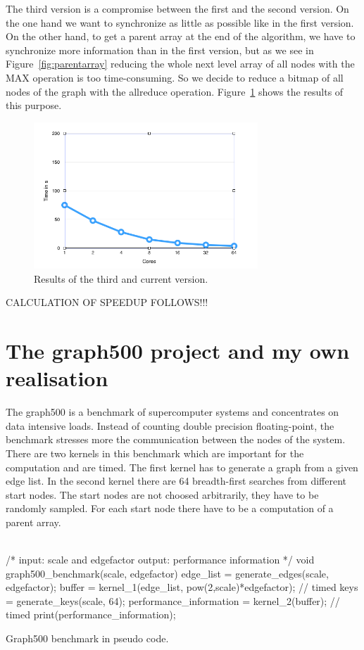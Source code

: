 \documentclass[12pt,a4paper]{article}
\begin{document}
The third version is a compromise between the first and the second version. On the one hand we want to synchronize as little as possible like in the first version. On the other hand, to get a parent array at the end of the algorithm, we have to synchronize more information than in the first version, but as we see in Figure~\ref{fig:parentarray} reducing the whole next level array of all nodes with the MAX operation is too time-consuming. So we decide to reduce a bitmap of all nodes of the graph with the allreduce operation. Figure~\ref{fig:allvisited} shows the results of this purpose.

\begin{figure}[H]
   \centering
   \includegraphics[width=0.75\textwidth]{allvisited}
   \caption{Results of the third and current version.}
   \label{fig:allvisited}
\end{figure}

CALCULATION OF SPEEDUP FOLLOWS!!!

\section{The graph500 project and my own realisation}
\label{sec:graph500}

The graph500 \cite{graph500} is a benchmark of supercomputer systems and concentrates on data intensive loads. Instead of counting double precision floating-point, the benchmark stresses more the communication between the nodes of the system. There are two kernels in this benchmark which are important for the computation and are timed. The first kernel has to generate a graph from a given edge list. In the second kernel there are 64 breadth-first searches from different start nodes. The start nodes are not choosed arbitrarily, they have to be randomly sampled. For each start node there have to be a computation of a parent array.\\
\\
\begin{listing}[H]
\begin{ccode}
/*
input: scale and edgefactor
output: performance information
*/
void graph500_benchmark(scale, edgefactor){
	edge_list = generate_edges(scale, edgefactor);
	buffer = kernel_1(edge_list, pow(2,scale)*edgefactor); // timed
	keys = generate_keys(scale, 64);
	performance_information = kernel_2(buffer); // timed
	print(performance_information);
}
\end{ccode}
\caption{Graph500 benchmark in pseudo code.}
\label{lst:graph500}
\end{listing}
\end{document}
